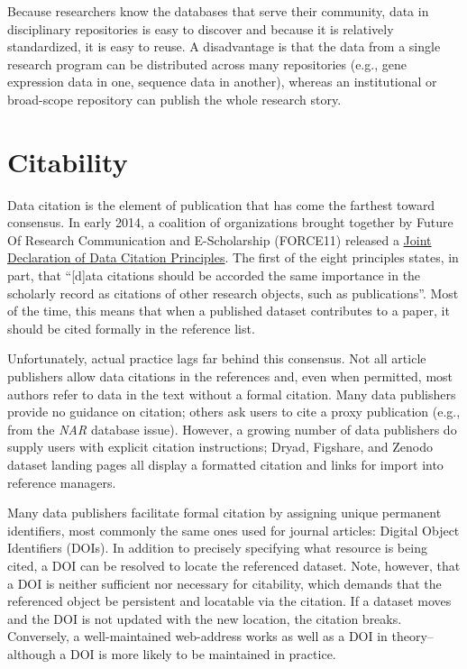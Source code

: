 \documentclass[10pt,a4paper,twocolumn]{article}
\begin{document}
{{Because researchers know the databases that serve their community, data in disciplinary repositories is easy to discover and because it is relatively standardized, it is easy to reuse. 
A disadvantage is that the data from a single research program can be distributed across many repositories (e.g., gene expression data in one, sequence data in another), whereas an institutional or broad-scope repository can publish the whole research story.


\section*{Citability}\label{citability}

Data citation is the element of publication that has come the farthest toward consensus.
In early 2014, a coalition of organizations brought together by Future Of Research Communication and E-Scholarship (FORCE11)\cite{bourne_improving_2012} released a \href{http://www.force11.org/datacitation}{Joint Declaration of Data Citation Principles}.
The first of the eight principles states, in part, that ``[d]ata citations should be accorded the same importance in the scholarly record as citations of other research objects, such as publications''.
Most of the time, this means that when a published dataset contributes to a paper, it should be cited formally in the reference list.
	
Unfortunately, actual practice lags far behind this consensus.
Not all article publishers allow data citations in the references and, even when permitted, most authors refer to data in the text without a formal citation\cite{mooney_anatomy_2012}.
Many data publishers provide no guidance on citation; others ask users to cite a proxy publication (e.g., from the \emph{NAR} database issue).
However, a growing number of data publishers do supply users with explicit citation instructions; Dryad, Figshare, and Zenodo dataset landing pages all display a formatted citation and links for import into reference managers.

Many data publishers facilitate formal citation by assigning unique permanent identifiers, most commonly the same ones used for journal articles: Digital Object Identifiers (DOIs).
In addition to precisely specifying what resource is being cited, a DOI can be resolved to locate the referenced dataset.
Note, however, that a DOI is neither sufficient nor necessary for citability, which demands that the referenced object be persistent and locatable via the citation.
If a dataset moves and the DOI is not updated with the new location, the citation breaks.
Conversely, a well-maintained web-address works as well as a DOI in theory-- although a DOI is more likely to be maintained in practice.

}}
\end{document}
